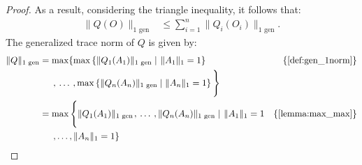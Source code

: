 \begin{proof}
As a result, considering the triangle inequality, it follows that:
\begin{equation} \label{eq:qo}
  \begin{split}
  \lVert Q(O)  \rVert_{1 \text{ gen}} & \leq   \sum_{i=1}^{n} \lVert Q_{i} (O_{i}) \rVert_{1 \text{ gen}}.
  \end{split}
\end {equation}
The generalized trace norm of $Q$ is given by:
\begin{equation}
  \begin{split} \label{eq:q}
  \lVert Q  \rVert_{1 \text{ gen}} & =   \max  \{ \max \left\{\|Q_{1} (A_1)\|_{1 \text{ gen}}   \mid \hspace{1pt} \|A_1\|_{1} = 1 \right\} & \{\text{\autoref{def:gen_1norm}}\} \\
  & \hspace{15pt} ,\hspace{2pt}  \ldots \hspace{2pt}  , \max \left\{  \|Q_{n} (A_n)\|_{1 \text{ gen}}   \mid \|A_n\|_{1} = 1 \right\} \Bigg\} \\
 & = \max \Bigg\{   \lVert Q_{1} (A_{1}) \rVert_{1 \text{ gen}} \hspace{1pt} , \hspace{2pt} \ldots \hspace{2pt}, \lVert Q_{n} (A_{n}) \rVert_{1 \text{ gen}} \mid \hspace{1pt}   \lVert A_{1} \rVert_{1} = 1  & \{\text{\autoref{lemma:max_max}} \} \\
 & \hspace{15pt} , \ldots,\lVert A_{n} \rVert_{1} = 1\}
  \end{split}
\end{equation}



\end{proof}
